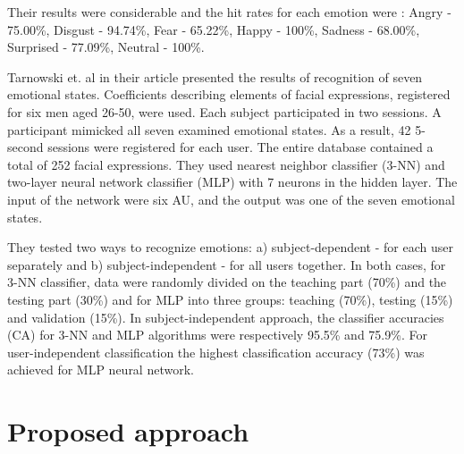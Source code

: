 \documentclass[runningheads,a4paper,11pt]{report}
\begin{document}
Their results were considerable and the hit rates for each emotion were : Angry - 75.00\%, Disgust - 94.74\%, Fear - 65.22\%, Happy - 100\%, Sadness - 68.00\%, Surprised - 77.09\%, Neutral - 100\%. \cite{Lucey10}


Tarnowski et. al in their article presented the results of recognition of seven emotional states. Coefficients describing elements of facial expressions, registered for six men aged 26-50, were used.
Each subject participated in two sessions. A participant mimicked all seven examined emotional states. As a result, 42 5-second sessions were registered for each user. The entire database contained a total of 252 facial expressions. \cite{Tarnowski17}
They used nearest neighbor classifier (3-NN) and two-layer neural network classifier (MLP) with 7 neurons in the hidden layer.
The input of the network were six AU, and the output was one of the seven emotional states.

They tested two ways to recognize emotions: a) subject-dependent - for each user separately and b) subject-independent - for all users together. In both cases, for 3-NN classifier, data were randomly divided on the teaching part (70\%) and the testing part (30\%) and for MLP into three groups: teaching (70\%), testing (15\%) and validation (15\%).
In subject-independent approach, the classifier accuracies (CA) for 3-NN and MLP algorithms were respectively 95.5\% and 75.9\%.
For user-independent classification the highest classification accuracy (73\%) was achieved for MLP neural network. \cite{Tarnowski17}




\chapter{Proposed approach}
\label{chapter:proposedApproach}
\end{document}
